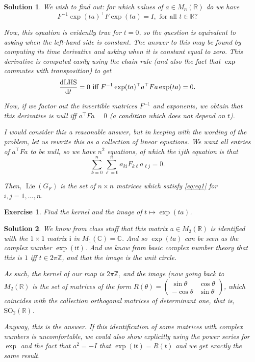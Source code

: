 \documentclass{article}
\newtheorem{ex}{Exercise}
\theoremstyle{nonumberplain}
\newtheorem{sol}{Solution}
\newcommand{\R}{\mathbb{R}}
\newcommand{\C}{\mathbb{C}}
\newcommand{\Z}{\mathbb{Z}}
\newcommand{\I}{\mathrm{i}}
\DeclareMathOperator{\Lie}{Lie}
\newcommand{\transpose}{\top}
\newcommand{\SO}{\mathrm{SO}}
\begin{document}
\begin{sol}
We wish to find out: for which values of $a \in M_n(\R)$ do we have
\begin{equation}
F^{-1} \exp(t a)^\transpose F \exp(t a) = I, \text{ for all $t \in \R$?}
\end{equation}

Now, this equation is evidently true for $t = 0$, so the question is equivalent to asking when the left-hand side is constant. The answer to this may be found by computing its time derivative and asking when it is constant equal to zero. This derivative is computed easily using the chain rule (and also the fact that $\exp$ commutes with transposition) to get
\begin{equation}
\diff{\text{LHS}}t = 0 \text{ iff } F^{-1} \exp(t a)^\transpose a^\transpose F a \exp(t a) = 0.
\end{equation}

Now, if we factor out the invertible matrices $F^{-1}$ and exponents, we obtain that this derivative is null iff $a^\transpose F a = 0$ (a condition which does not depend on $t$).

I would consider this a reasonable answer, but in keeping with the wording of the problem, let us rewrite this as a collection of linear equations. We want all entries of $a^\transpose F a$ to be null, so we have $n^2$ equations, of which the $ij$th equation is that
\begin{equation}\label{eq:eq1}
\sum_{k = 0}^n \sum_{\ell = 0}^n a_{ki} F_{k \ell} a_{\ell j} = 0.
\end{equation}

Then, $\Lie(G_F)$ is the set of $n \times n$ matrices which satisfy \eqref{eq:eq1} for $i, j = 1, \dots, n$.
\end{sol}

\pagebreak

\begin{ex}
Find the kernel and the image of $t \mapsto \exp(t a)$.
\end{ex}

\begin{sol}
We know from class stuff that this matrix $a \in M_2(\R)$ is identified with the $1 \times 1$ matrix $\I$ in $M_1(\C) = \C$. And so $\exp(t a)$ can be seen as the complex number $\exp(\I t)$. And we know from basic complex number theory that this is $1$ iff $t \in 2 \pi \Z$, and that the image is the unit circle.

As such, the kernel of our map is $2 \pi \Z$, and the image (now going back to $M_2(\R)$ is the set of matrices of the form $R(\theta) = \left(\begin{smallmatrix}\sin \theta & \cos\theta \\ -\cos\theta & \sin\theta\end{smallmatrix}\right)$, which coincides with the collection orthogonal matrices of determinant one, that is, $\SO_2(\R)$.

Anyway, this is the answer. If this identification of some matrices with complex numbers is uncomfortable, we could also show explicitly using the power series for $\exp$ and the fact that $a^2 = -I$ that $\exp(\I t) = R(t)$ and we get exactly the same result.
\end{sol}
\end{document}
